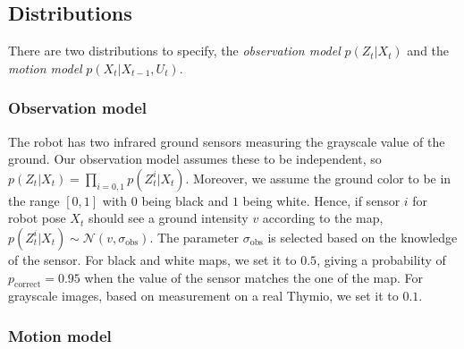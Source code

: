 \documentclass[letterpaper, 10pt, conference]{ieeeconf}
\begin{document}
\subsection{Distributions}

There are two distributions to specify, the \emph{observation model} $p(Z_t | X_t)$ and the \emph{motion model} $p(X_t|X_{t-1}, U_t)$.

\subsubsection{Observation model}

The robot has two infrared ground sensors measuring the grayscale value of the ground.
Our observation model assumes these to be independent, so $p(Z_t | X_t) = \prod_{i=0,1} p(Z_t^{i} | X_t)$.
Moreover, we assume the ground color to be in the range $[0,1]$ with $0$ being black and $1$ being white.
Hence, if sensor $i$ for robot pose $X_t$ should see a ground intensity $v$ according to the map, $p(Z_t^{i} | X_t) \sim \mathcal{N}(v,\sigma_\mathrm{obs})$.
The parameter $\sigma_\mathrm{obs}$ is selected based on the knowledge of the sensor.
For black and white maps, we set it to $0.5$, giving a probability of $p_\mathrm{correct} = 0.95$ when the value of the sensor matches the one of the map.
For grayscale images, based on measurement on a real Thymio, we set it to $0.1$.

\subsubsection{Motion model}
\end{document}
